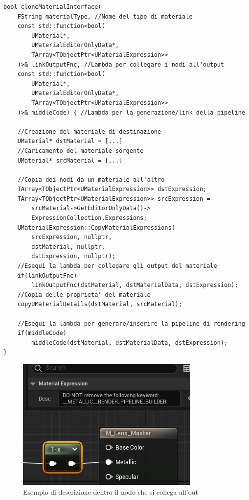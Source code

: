\documentclass[main.tex]{subfiles}
\begin{document}
\begin{lstlisting}
bool cloneMaterialInterface(
    FString materialType, //Nome del tipo di materiale
    const std::function<bool(
        UMaterial*,
        UMaterialEditorOnlyData*,
        TArray<TObjectPtr<UMaterialExpression>>
    )>& linkOutputFnc, //Lambda per collegare i nodi all'output
    const std::function<bool(
        UMaterial*,
        UMaterialEditorOnlyData*,
        TArray<TObjectPtr<UMaterialExpression>>
    )>& middleCode) { //Lambda per la generazione/link della pipeline

    //Creazione del materiale di destinazione
    UMaterial* dstMaterial = [...]
    //Caricamento del materiale sorgente
    UMaterial* srcMaterial = [...]

    //Copia dei nodi da un materiale all'altro
	TArray<TObjectPtr<UMaterialExpression>> dstExpression;
	TArray<TObjectPtr<UMaterialExpression>> srcExpression =
        srcMaterial->GetEditorOnlyData()->
        ExpressionCollection.Expressions;
	UMaterialExpression::CopyMaterialExpressions(
        srcExpression, nullptr,
        dstMaterial, nullptr,
        dstExpression, nullptr);
	//Esegui la lambda per collegare gli output del materiale
	if(linkOutputFnc)
        linkOutputFnc(dstMaterial, dstMaterialData, dstExpression);
	//Copia delle proprieta' del materiale
	copyUMaterialDetails(dstMaterial, srcMaterial);

	//Esegui la lambda per generare/inserire la pipeline di rendering
	if(middleCode)
        middleCode(dstMaterial, dstMaterialData, dstExpression);
}
\end{lstlisting}
\clearpage %
\begin{figure}
    \centering
    \captionsetup{justification=centering}
    \includegraphics[scale=0.65]{img/renderingPipeline/descLink.jpg}
    \caption{Esempio di descrizione dentro il nodo che si collega all'out}
    \label{fig:2_searchDesc}
\end{figure}
\end{document}
